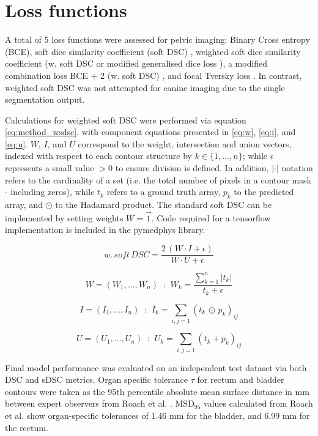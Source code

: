 \section{Loss functions}
\label{ch:method-loss}
A total of 5 loss functions were assessed for pelvic imaging: Binary Cross entropy (BCE), soft dice similarity coefficient (soft DSC) \cite{Bertels2019}, weighted soft dice similarity coefficient (w. soft DSC or modified generalised dice loss \cite{Sudre_2017}), a modified combination loss BCE + 2 (w. soft DSC) \cite{taghanaki2018}, and focal Tversky loss \cite{Zhu_2018, Khan2019, abraham2018}. In contrast, weighted soft DSC was not attempted for canine imaging due to the single segmentation output.

Calculations for weighted soft DSC were performed via equation \ref{eq:method_wsdsc}, with component equations presented in \ref{eq:w}, \ref{eq:i}, and \ref{eq:u}. $W$, $I$, and $U$ correspond to the weight, intersection and union vectors, indexed with respect to each contour structure by $k\in\{1,...,n\}$; while $\epsilon$ represents a small value $>0$ to ensure division is defined. In addition, $|\cdot|$ notation refers to the cardinality of a set (i.e. the total number of pixels in a contour mask - including zeros), while $t_{k}$ refers to a ground truth array, $p_{k}$ to the predicted array, and $\odot$ to the Hadamard product. The standard soft DSC can be implemented by setting weights $W=\vec{1}$.  Code required for a tensorflow implementation is included in the pymedphys library.

\begin{equation}
w. \, soft \, DSC = \frac{2 \, (W \cdot I + \epsilon)}{W \cdot U + \epsilon}
\label{eq:method_wsdsc}
\end{equation}

\begin{equation}
W = (W_{1}, ..., W_{n}) \; \; \textbf{:} \; \; W_{k} = \frac{\sum_{k=1}^{n} |t_{k} |}{t_{k} + \epsilon}
\label{eq:w}
\end{equation}

\begin{equation}
I = (I_{1}, ..., I_{n}) \; \; \textbf{:} \; \; I_{k} = \sum_{i,j=1}(t_{k} \, \odot \,  p_{k})_{ij}
\label{eq:i}
\end{equation}

\begin{equation}
U = (U_{1}, ..., U_{n}) \; \; \textbf{:} \; \; U_{k} =  \sum_{i,j=1}(t_{k} + p_{k})_{ij}
\label{eq:u}
\end{equation}


Final model performance was evaluated on an independent test dataset via both DSC and sDSC metrics. Organ specific tolerance $\tau$ for rectum and bladder contours were taken as the 95th percentile absolute mean surface distance in mm between expert observers from Roach et al. \cite{Roach_2019}. MSD$_{95}$ values calculated from Roach et al. show organ-specific tolerances of 1.46 mm for the bladder, and 6.99 mm for the rectum.